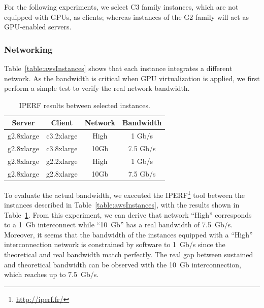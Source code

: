 \documentclass[a4paper,twoside]{article}
\begin{document}
For the following experiments, we select C3 family instances, which are not equipped with GPUs, as clients; whereas instances of the G2 family will act as GPU-enabled servers.   

\subsubsection{Networking}
Table~\ref{table:awsInstances} shows that each instance integrates a different 
network. As the bandwidth 
is critical when GPU virtualization is applied, we first perform a simple test to verify the 
real network bandwidth.

\begin{table}[htb]
\renewcommand{\arraystretch}{1.3}
\caption{IPERF results between selected instances.}
\label{table:iperf}
\tabcolsep=0.24cm
\begin{center}\begin{tabular}{cccc}
Server & Client & Network & Bandwidth\\ \hline \hline
g2.8xlarge & c3.2xlarge & High & 1  Gb/s\\ \hline
g2.8xlarge & c3.8xlarge & 10Gb & 7.5  Gb/s\\ \hline
g2.8xlarge & g2.2xlarge & High & 1 Gb/s\\ \hline
g2.8xlarge & g2.8xlarge & 10Gb & 7.5  Gb/s\\ \hline
\end{tabular}\end{center}\end{table}

To evaluate the actual bandwidth, we executed 
the IPERF\footnote{\url{http://iperf.fr/}} tool between the instances described in 
Table~\ref{table:awsInstances}, with the results shown in Table~\ref{table:iperf}.
From this experiment, we can derive that network ``High'' corresponds to a 1~Gb interconnect while ``10~Gb'' has 
a real bandwidth of 7.5~Gb/s.
Moreover, it seems that the bandwidth of the instances equipped with a ``High'' interconnection network
is constrained by software to 1~Gb/s since the theoretical and real bandwidth 
match perfectly. The real gap between sustained and theoretical bandwidth can be observed with 
the 10~Gb interconnection, which reaches up to 7.5~Gb/s.
\end{document}
